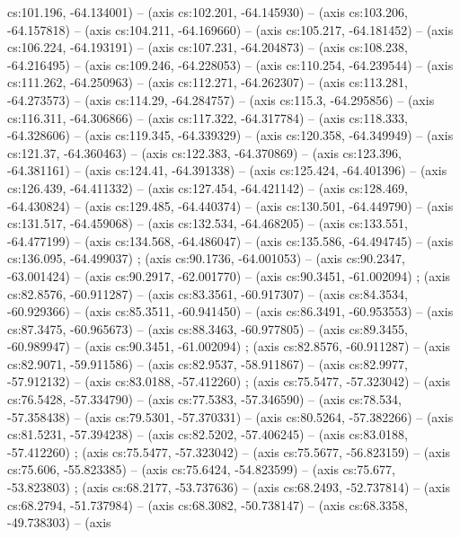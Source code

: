   cs:101.196, -64.134001) -- (axis cs:102.201, -64.145930) -- (axis
  cs:103.206, -64.157818) -- (axis cs:104.211, -64.169660) -- (axis
  cs:105.217, -64.181452) -- (axis cs:106.224, -64.193191) -- (axis
  cs:107.231, -64.204873) -- (axis cs:108.238, -64.216495) -- (axis
  cs:109.246, -64.228053) -- (axis cs:110.254, -64.239544) -- (axis
  cs:111.262, -64.250963) -- (axis cs:112.271, -64.262307) -- (axis
  cs:113.281, -64.273573) -- (axis cs:114.29, -64.284757) -- (axis cs:115.3,
  -64.295856) -- (axis cs:116.311, -64.306866) -- (axis cs:117.322,
  -64.317784) -- (axis cs:118.333, -64.328606) -- (axis cs:119.345,
  -64.339329) -- (axis cs:120.358, -64.349949) -- (axis cs:121.37, -64.360463)
  -- (axis cs:122.383, -64.370869) -- (axis cs:123.396, -64.381161) -- (axis
  cs:124.41, -64.391338) -- (axis cs:125.424, -64.401396) -- (axis cs:126.439,
  -64.411332) -- (axis cs:127.454, -64.421142) -- (axis cs:128.469,
  -64.430824) -- (axis cs:129.485, -64.440374) -- (axis cs:130.501,
  -64.449790) -- (axis cs:131.517, -64.459068) -- (axis cs:132.534,
  -64.468205) -- (axis cs:133.551, -64.477199) -- (axis cs:134.568,
  -64.486047) -- (axis cs:135.586, -64.494745) -- (axis cs:136.095,
  -64.499037) ;  (axis cs:90.1736, -64.001053) --
  (axis cs:90.2347, -63.001424) -- (axis cs:90.2917, -62.001770) -- (axis
  cs:90.3451, -61.002094) ;  (axis cs:82.8576,
  -60.911287) -- (axis cs:83.3561, -60.917307) -- (axis cs:84.3534,
  -60.929366) -- (axis cs:85.3511, -60.941450) -- (axis cs:86.3491,
  -60.953553) -- (axis cs:87.3475, -60.965673) -- (axis cs:88.3463,
  -60.977805) -- (axis cs:89.3455, -60.989947) -- (axis cs:90.3451,
  -61.002094) ;  (axis cs:82.8576, -60.911287) --
  (axis cs:82.9071, -59.911586) -- (axis cs:82.9537, -58.911867) -- (axis
  cs:82.9977, -57.912132) -- (axis cs:83.0188, -57.412260)
  ;  (axis cs:75.5477, -57.323042) -- (axis
  cs:76.5428, -57.334790) -- (axis cs:77.5383, -57.346590) -- (axis cs:78.534,
  -57.358438) -- (axis cs:79.5301, -57.370331) -- (axis cs:80.5264,
  -57.382266) -- (axis cs:81.5231, -57.394238) -- (axis cs:82.5202,
  -57.406245) -- (axis cs:83.0188, -57.412260) ; 
  (axis cs:75.5477, -57.323042) -- (axis cs:75.5677, -56.823159) -- (axis
  cs:75.606, -55.823385) -- (axis cs:75.6424, -54.823599) -- (axis cs:75.677,
  -53.823803) ;  (axis cs:68.2177, -53.737636) --
  (axis cs:68.2493, -52.737814) -- (axis cs:68.2794, -51.737984) -- (axis
  cs:68.3082, -50.738147) -- (axis cs:68.3358, -49.738303) -- (axis
